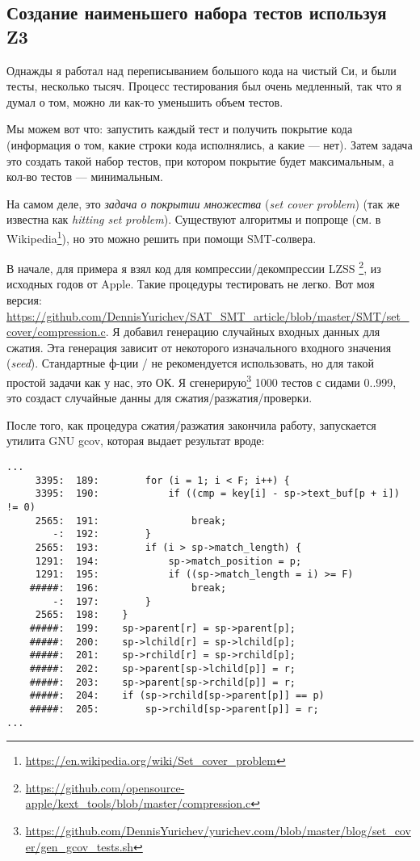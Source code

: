 \subsection{Создание наименьшего набора тестов используя Z3}
\label{set_cover}

Однажды я работал над переписыванием большого кода на чистый Си, и были тесты, несколько тысяч.
Процесс тестирования был очень медленный, так что я думал о том, можно ли как-то уменьшить объем тестов.

Мы можем вот что: запустить каждый тест и получить покрытие кода
(информация о том, какие строки кода исполнялись, а какие --- нет).
Затем задача это создать такой набор тестов, при котором покрытие будет максимальным, а кол-во тестов --- минимальным.

На самом деле, это \textit{задача о покрытии множества} (\textit{set cover problem})
(так же известна как \textit{hitting set problem}).
Существуют алгоритмы и попроще (см. в Wikipedia\footnote{\url{https://en.wikipedia.org/wiki/Set_cover_problem}}),
но это можно решить при помощи SMT-солвера.

В начале, для примера я взял код для компрессии/декомпрессии \ac{LZSS}
\footnote{\url{https://github.com/opensource-apple/kext_tools/blob/master/compression.c}},
из исходных годов от Apple.
Такие процедуры тестировать не легко.
Вот моя версия:
\url{https://github.com/DennisYurichev/SAT_SMT_article/blob/master/SMT/set_cover/compression.c}.
Я добавил генерацию случайных входных данных для сжатия.
Эта генерация зависит от некоторого изначального входного значения (\textit{seed}).
Стандартные ф-ции / не рекомендуется использовать, но для такой простой задачи как у нас, это ОК.
Я сгенерирую\footnote{\url{https://github.com/DennisYurichev/yurichev.com/blob/master/blog/set_cover/gen_gcov_tests.sh}}
1000 тестов с сидами 0..999, это создаст случайные данны для сжатия/разжатия/проверки.

После того, как процедура сжатия/разжатия закончила работу,
запускается утилита GNU gcov, которая выдает результат вроде:

\begin{lstlisting}
...
     3395:  189:        for (i = 1; i < F; i++) {
     3395:  190:            if ((cmp = key[i] - sp->text_buf[p + i]) != 0)
     2565:  191:                break;
        -:  192:        }
     2565:  193:        if (i > sp->match_length) {
     1291:  194:            sp->match_position = p;
     1291:  195:            if ((sp->match_length = i) >= F)
    #####:  196:                break;
        -:  197:        }
     2565:  198:    }
    #####:  199:    sp->parent[r] = sp->parent[p];
    #####:  200:    sp->lchild[r] = sp->lchild[p];
    #####:  201:    sp->rchild[r] = sp->rchild[p];
    #####:  202:    sp->parent[sp->lchild[p]] = r;
    #####:  203:    sp->parent[sp->rchild[p]] = r;
    #####:  204:    if (sp->rchild[sp->parent[p]] == p)
    #####:  205:        sp->rchild[sp->parent[p]] = r;
...
\end{lstlisting}

